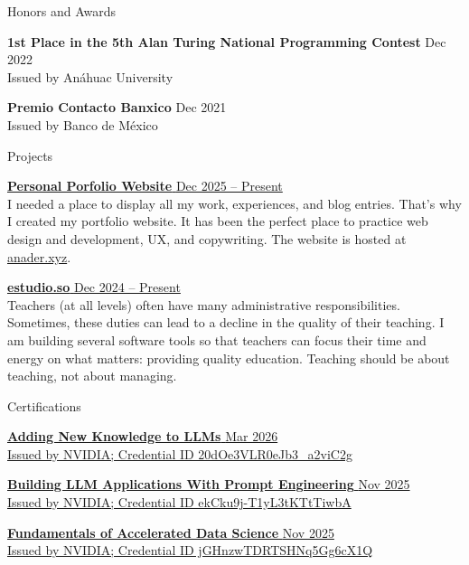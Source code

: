 \documentclass{resume} %
\begin{document}

\pagebreak
\begin{rSection}{ Honors and Awards }

{\bf 1st Place in the 5th Alan Turing National Programming Contest } \hfill {Dec 2022}
\\ 
Issued by Anáhuac University

{\bf Premio Contacto Banxico} \hfill {Dec 2021}
\\ 
Issued by Banco de México

\end{rSection}  


\begin{rSection}{ Projects }

\href{https://www.anader.xyz}{{\bf Personal Porfolio Website} \hfill {Dec 2025 -- Present}}
\\ 
I needed a place to display all my work, experiences, and blog entries. That's why I created my portfolio website. It has been the perfect place to practice web design and development, UX, and copywriting. The website is hosted at \href{https://www.anader.xyz}{anader.xyz}.

\href{https://estudio.so}{{\bf estudio.so} \hfill {Dec 2024 -- Present}}
\\ 
Teachers (at all levels) often have many administrative responsibilities. Sometimes, these duties can lead to a decline in the quality of their teaching. I am building several software tools so that teachers can focus their time and energy on what matters: providing quality education. Teaching should be about teaching, not about managing.

\end{rSection} 


\begin{rSection}{ Certifications }

\href{https://learn.nvidia.com/certificates?id=20dOe3VLR0eJb3_a2viC2g}{%
    {\bf{Adding New Knowledge to LLMs}} \hfill{Mar 2026}
    \\
    Issued by NVIDIA; Credential ID 20dOe3VLR0eJb3\_a2viC2g
}

\href{https://learn.nvidia.com/certificates?id=ekCku9j-T1yL3tKTtTiwbA}{%
    {\bf{Building LLM Applications With Prompt Engineering}} \hfill{Nov 2025}
    \\
    Issued by NVIDIA; Credential ID ekCku9j-T1yL3tKTtTiwbA
}

\href{https://learn.nvidia.com/certificates?id=jGHnzwTDRTSHNq5Gg6cX1Q}{%
    {\bf{Fundamentals of Accelerated Data Science}} \hfill{Nov 2025}
    \\
    Issued by NVIDIA; Credential ID jGHnzwTDRTSHNq5Gg6cX1Q
}

\end{rSection}
\end{document}
